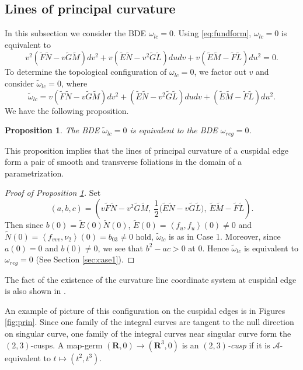 \documentclass[a4paper, 12pt]{article}
\newtheorem{proposition}[theorem]{Proposition}
\theoremstyle{definition}
\numberwithin{equation}{section}
\begin{document}
\subsection{Lines of principal curvature}\label{sec:lc}
In this subsection we consider the BDE $\omega_{lc}=0$.
Using \eqref{eq:fundform},
$\omega_{lc}=0$ is equivalent to
$$
v^2\left(\widetilde F\widetilde N - v\widetilde G\widetilde M\right)dv^2 
+v\left(\widetilde E\widetilde N-v^2\widetilde  G\widetilde  L\right)dudv
+v\left(\widetilde E\widetilde M-\widetilde F\widetilde  L\right)du^2=0.$$
To determine the topological configuration of $\omega_{lc}=0$,
we factor out $v$ and consider $\widetilde\omega_{lc}=0$, where
$$
\widetilde\omega_{lc}
=
v\left(\widetilde F\widetilde N - v\widetilde G\widetilde M\right)dv^2 
+\left(\widetilde E\widetilde N-v^2\widetilde  G\widetilde  L\right)dudv
+\left(\widetilde E\widetilde M-\widetilde F\widetilde  L\right)du^2.
$$
We have the following proposition.
\begin{proposition}\label{prop:lc}
The BDE\/ $\widetilde\omega_{lc}=0$ is equivalent to 
the BDE\/ $\omega_{reg}=0$.
\end{proposition}
This proposition implies that
the lines of principal curvature of
a cuspidal edge
form a pair of smooth and transverse foliations
in the domain of a parametrization.
\begin{proof}[Proof of Proposition\/ {\rm \ref{prop:lc}}]
Set
$$
(a,b,c)=\left(
v\widetilde F\widetilde N - v^2 \widetilde G \widetilde M,\ 
\dfrac{1}{2}\Big(\widetilde E \widetilde N
-v \widetilde G \widetilde L\Big),\ 
\widetilde E \widetilde M-\widetilde F\widetilde L\right).
$$
Then since 
$b(0)=\widetilde E(0)\widetilde N(0)$,
$\widetilde E(0)={\left\langle{{f_u}},{{f_u}}\right\rangle}(0)\ne0$
and
$\widetilde N(0)={\left\langle{{f_{vvv}}},{{\nu_2}}\right\rangle}(0)=b_{03}\ne0$
hold, $\widetilde \omega_{lc}$ is as in Case 1.
Moreover, since $a(0)=0$ and $b(0)\ne0$,
we see that $b^2-ac>0$ at $0$.
Hence $\widetilde\omega_{lc}$ is equivalent
to $\omega_{reg}=0$ (See Section \ref{sec:case1}).
\end{proof}
The fact of
the existence of the curvature 
line coordinate system at cuspidal edge
is also shown in \cite{mu}.

An example of picture of this configuration on 
the cuspidal edges
is in Figures \ref{fig:prin}.
Since one family of the integral curves 
are tangent to the null direction on
singular curve,
one family of the integral curves 
near singular curve form the
$(2,3)$-cusps.
A map-germ $({\boldsymbol{R}},0)\to({\boldsymbol{R}}^3,0)$ is an {\it $(2,3)$-cusp\/}
if it is ${\mathcal{A}}$-equivalent to $t\mapsto(t^2,t^3)$.
\end{document}
